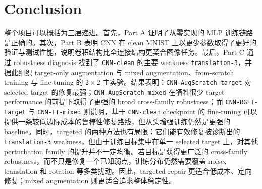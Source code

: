 \documentclass[12pt,a4paper,fontset=fandol]{ctexart}
\begin{document}
\section{Conclusion}

整个项目可以概括为三层递进。首先，Part A 证明了从零实现的 MLP 训练链路是正确的。其次，Part B 表明 CNN 在 clean MNIST 上以更少参数取得了更好的验证与测试性能，说明卷积结构比全连接结构更契合图像任务。最后，Part C 通过 robustness diagnosis 找到了 \texttt{CNN-clean} 的主要 weakness \texttt{translation-3}，并据此组织 target-only augmentation 与 mixed augmentation、from-scratch training 与 fine-tuning 的 $2 \times 2$ 主实验。结果表明：\texttt{CNN-AugScratch-target} 对 selected target 的修复最强；\texttt{CNN-AugScratch-mixed} 在牺牲很少 target performance 的前提下取得了更强的 broad cross-family robustness；而 \texttt{CNN-RGFT-target} 与 \texttt{CNN-FT-mixed} 则说明，基于 \texttt{CNN-clean} checkpoint 的 fine-tuning 可以提供一条较低边际成本的鲁棒性修复路线，但从头增强训练仍然是更强的 baseline。同时，targeted 的两种方法也有局限：它们能有效修复被诊断出的 \texttt{translation-3} weakness，但由于训练目标集中在单一 selected target 上，对其他 perturbation family 的提升并不一定均衡。若目标是获得更广泛的 cross-family robustness，而不只是修复一个已知弱点，训练分布仍然需要覆盖 noise、translation 和 rotation 等多类扰动。因此，targeted repair 更适合低成本、定向修复；mixed augmentation 则更适合追求整体稳定性。
\end{document}

